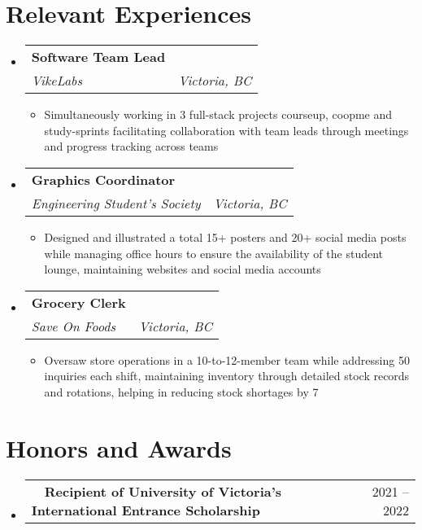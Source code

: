 \documentclass[a4paper,10pt]{article}
\makeatletter
\newcommand{\resumeItemDot}[1]
{\item \normalsize{#1}}
\newcommand{\resumeSubheading}[4]{
  \item
    \begin{tabular*}{\dimexpr\textwidth-1.2em\relax}{@{}l@{\extracolsep{\fill}}r@{}}
      \large \textbf{#1} & \fontsize{11}{12}\selectfont \text{#2} \\
      \textit{#3} & \textit{#4} \\
    \end{tabular*}\vspace{-2pt}
}
\newcommand{\resumeScholarshipSubheading}[2]{
  \item
    \begin{tabular*}{\dimexpr\textwidth-1.2em\relax}{@{}l@{\extracolsep{\fill}}r@{}}
      \textbullet \ \ \textbf{#1} & \normalsize{#2} \\
    \end{tabular*}\vspace{-2pt}
}
\newenvironment{resumeSubHeadingListStart}
{\begin{itemize}[leftmargin=0.10in, label={}]}
{\end{itemize}}
\newenvironment{resumeItemListStart}
{\begin{itemize}[leftmargin=0.15in, label={$\bullet$}]}
{\end{itemize}}
\makeatother
\begin{document}
\section{Relevant Experiences}
\begin{resumeSubHeadingListStart}
\resumeSubheading
    {Software Team Lead}
    {Feb 2024 – Present}
    {VikeLabs}
    {Victoria, BC}
\begin{resumeItemListStart}
    \resumeItemDot{Simultaneously working in 3 full-stack projects courseup, coopme and study-sprints facilitating collaboration with team leads through meetings and progress tracking across teams}
\end{resumeItemListStart}
\end{resumeSubHeadingListStart}

\begin{resumeSubHeadingListStart}
\resumeSubheading
    {Graphics Coordinator}
    {Jan 2023 – Present}
    {Engineering Student’s Society}
    {Victoria, BC}
\begin{resumeItemListStart}
    \resumeItemDot{Designed and illustrated a total 15+ posters and 20+ social media posts while managing office hours to ensure the availability of the student lounge, maintaining websites and social media accounts}
\end{resumeItemListStart}
\end{resumeSubHeadingListStart}

\begin{resumeSubHeadingListStart}
\resumeSubheading
    {Grocery Clerk}
    {Sept. 2021 – Aug 2023}
    {Save On Foods}
    {Victoria, BC}
\begin{resumeItemListStart}
    \resumeItemDot{Oversaw store operations in a 10-to-12-member team while addressing 50 inquiries each shift, maintaining inventory through detailed stock records and rotations, helping in reducing stock shortages by 7}
\end{resumeItemListStart}
\end{resumeSubHeadingListStart}

\section{Honors and Awards}
\begin{resumeSubHeadingListStart}
\resumeScholarshipSubheading{Recipient of University of Victoria’s International Entrance Scholarship}{2021 – 2022}
\end{resumeSubHeadingListStart}
\end{document}
